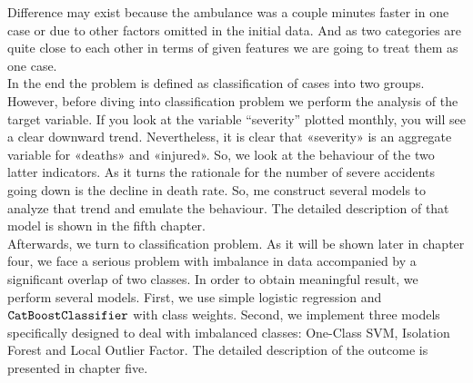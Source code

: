 Difference may exist because the ambulance was a couple minutes faster in one case or due to other factors omitted in the initial data.
And as two categories are quite close to each other in terms of given features we are going to treat them as one case. \\
In the end the problem is defined as classification of cases into two groups.
However, before diving into classification problem we perform the analysis of the target variable.
If you look at the variable “severity” plotted monthly, you will see a clear downward trend.
Nevertheless, it is clear that «severity» is an aggregate variable for «deaths» and «injured».
So, we look at the behaviour of the two latter indicators.
As it turns the rationale for the number of severe accidents going down is the decline in death rate.
So, me construct several models to analyze that trend and emulate the behaviour. 
The detailed description of that model is shown in the fifth chapter. \\
Afterwards, we turn to classification problem. As it will be shown later in chapter four,
we face a serious problem with imbalance in data accompanied by a significant overlap of two classes.
In order to obtain meaningful result, we perform several models. First, we use simple logistic regression and $\verb|CatBoostClassifier|$ with class weights.
Second, we implement three models specifically designed to deal with imbalanced classes: One-Class SVM, Isolation Forest and Local Outlier Factor.
The detailed description of the outcome is presented in chapter five. 
